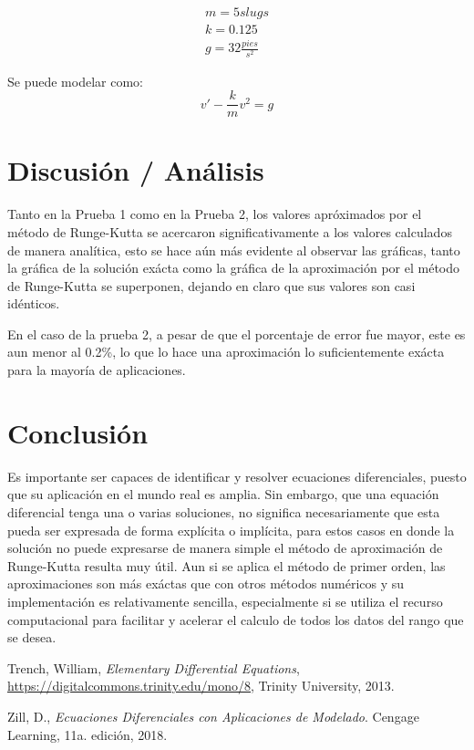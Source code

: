 \documentclass[article, 11pt]{IEEEtran}   %
\begin{document}
\begin{gather*}
m=5slugs\\
k=0.125\\
g=32\frac{pies}{s^2}
\end{gather*}

Se puede modelar como:
\begin{equation}
v\prime-\frac{k}{m}v^2=g
\end{equation}
\newpage


\section{Discusi\'on / An\'alisis}
Tanto en la Prueba 1 como en la Prueba 2, los valores apróximados por el método de Runge-Kutta se acercaron significativamente a los valores calculados de manera analítica, esto se hace aún más evidente al observar las gráficas, tanto la gráfica de la solución exácta como la gráfica de la aproximación por el método de Runge-Kutta se superponen, dejando en claro que sus valores son casi idénticos.
\vspace{1em}

En el caso de la prueba 2, a pesar de que el porcentaje de error fue mayor, este es aun menor al 0.2\%, lo que lo hace una aproximación lo suficientemente exácta para la mayoría de aplicaciones.
\vspace{1em}


\section{Conclusi\'on}
Es importante ser capaces de identificar y resolver ecuaciones diferenciales, puesto que su aplicación en el mundo real es amplia. Sin embargo, que una equación diferencial tenga una o varias soluciones, no significa necesariamente que esta pueda ser expresada de forma explícita o implícita, para estos casos en donde la solución no puede expresarse de manera simple el método de aproximación de Runge-Kutta resulta muy útil. Aun si se aplica el método de primer orden, las aproximaciones son más exáctas que con otros métodos numéricos y su implementación es relativamente sencilla, especialmente si se utiliza el recurso computacional para facilitar y acelerar el calculo de todos los datos del rango que se desea.

\begin{thebibliography}{1}

Trench, William, \emph{Elementary Differential Equations}, \url{https://digitalcommons.trinity.edu/mono/8}, Trinity University, 2013.

Zill, D., \emph{Ecuaciones Diferenciales con Aplicaciones de Modelado}. Cengage Learning, 11a. edición, 2018.

\end{thebibliography}
\end{document}
